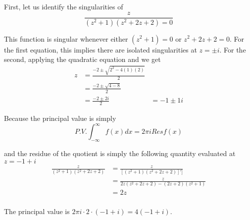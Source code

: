 \documentclass[11pt]{article}
\begin{document}
\begin{enumerate}
	First, let us identify the singularities of 
	\[\frac{z}{(z^2 + 1)(z^2 + 2z + 2) = 0} \]
	
	This function is singular whenever either $(z^2 + 1) = 0$ or $z^2 + 2z + 2 = 0$. For the first equation, this implies there are isolated singularities at $z = \pm i$. For the second, applying the quadratic equation and we get
	\[\begin{aligned}
	z
	&= \frac{-2 \pm \sqrt{2^2 - 4(1)(2)}}{2} \\
	&= \frac{-2 \pm \sqrt{4 - 8}}{2} \\
	&= \frac{-2 \pm 2i}{2}
	&= -1 \pm 1i
	\end{aligned}\]
	
	Because the principal value is simply
	\[P.V. \int^\infty_{-\infty} f(x) dx = 2\pi i Res f(x) \]

	 and the residue of the quotient is simply the following quantity evaluated at
	 $z = -1 + i$
	\[\begin{aligned}
	\frac{z}{(z^2 + 1)(z^2 + 2z + 2)} 
	&= \frac{z}{[(z^2 + 1)(z^2 + 2z + 2)]']} \\
	&= \frac{z}{2z(z^2 + 2z + 2) - (2z + 2)(z^2 + 1)} \\
	&= 2z \\
	\end{aligned}\]
	
	The principal value is $2\pi i \cdot 2 \cdot (-1 + i) = 4(-1 + i)$.
\end{enumerate}
\end{document}
